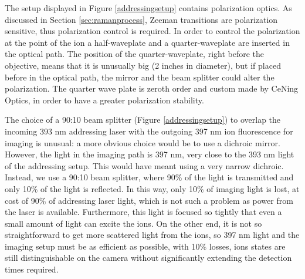 The setup displayed in Figure \ref{addressingsetup} contains polarization optics. As discussed in Section \ref{sec:ramanprocess}, Zeeman transitions are polarization sensitive, thus polarization control is required. In order to control the polarization at the point of the ion a half-waveplate and a quarter-waveplate are inserted in the optical path. The position of the quarter-waveplate, right before the objective, means that it is unusually big (2 inches in diameter), but if placed before in the optical path, the mirror and the beam splitter could alter the polarization. The quarter wave plate is zeroth order and custom made by CeNing Optics, in order to have a greater polarization stability.\par
The choice of a 90:10 beam splitter (Figure \ref{addressingsetup}) to overlap the incoming 393 nm addressing laser with the outgoing 397 nm ion fluorescence for imaging is unusual: a more obvious choice would be to use a dichroic mirror. However, the light in the imaging path is 397 nm, very close to the 393 nm light of the addressing setup. This would have meant using a very narrow dichroic. Instead, we use a 90:10 beam splitter, where 90\% of the light is transmitted and only 10\% of the light is reflected. In this way, only 10\% of imaging light is lost, at cost of 90\% of addressing laser light, which is not such a problem as power from the laser is available. Furthermore, this light is focused so tightly that even a small amount of light can excite the ions. On the other end, it is not so straightforward to get more scattered light from the ions, so 397 nm light and the imaging setup must be as efficient as possible, with 10\% losses, ions states are still distinguishable on the camera without significantly extending the detection times required.

